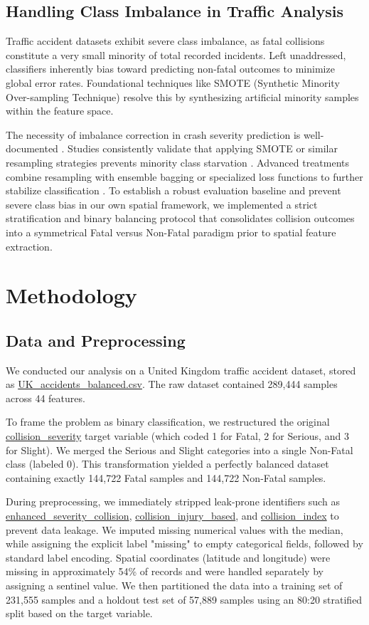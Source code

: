 \documentclass[runningheads]{llncs}
\begin{document}
\subsection{Handling Class Imbalance in Traffic Analysis}
Traffic accident datasets exhibit severe class imbalance, as fatal collisions constitute a very small minority of total recorded incidents. Left unaddressed, classifiers inherently bias toward predicting non-fatal outcomes to minimize global error rates. Foundational techniques like SMOTE (Synthetic Minority Over-sampling Technique) \cite{chawla2002} resolve this by synthesizing artificial minority samples within the feature space.

The necessity of imbalance correction in crash severity prediction is well-documented \cite{amiri2025,bazarnovi2024,fiorentini2020}. Studies consistently validate that applying SMOTE or similar resampling strategies prevents minority class starvation \cite{jeong2018,ogungbire2024}. Advanced treatments combine resampling with ensemble bagging or specialized loss functions to further stabilize classification \cite{mohammadpour2023,niyogisubizo2023}. To establish a robust evaluation baseline and prevent severe class bias in our own spatial framework, we implemented a strict stratification and binary balancing protocol that consolidates collision outcomes into a symmetrical Fatal versus Non-Fatal paradigm prior to spatial feature extraction.


\section{Methodology}

\subsection{Data and Preprocessing}

We conducted our analysis on a United Kingdom traffic accident dataset, stored as \url{UK_accidents_balanced.csv}. The raw dataset contained 289,444 samples across 44 features.

To frame the problem as binary classification, we restructured the original \url{collision_severity} target variable (which coded 1 for Fatal, 2 for Serious, and 3 for Slight). We merged the Serious and Slight categories into a single Non-Fatal class (labeled 0). This transformation yielded a perfectly balanced dataset containing exactly 144,722 Fatal samples and 144,722 Non-Fatal samples.

During preprocessing, we immediately stripped leak-prone identifiers such as \url{enhanced_severity_collision}, \url{collision_injury_based}, and \url{collision_index} to prevent data leakage. We imputed missing numerical values with the median, while assigning the explicit label "missing" to empty categorical fields, followed by standard label encoding. Spatial coordinates (latitude and longitude) were missing in approximately 54\% of records and were handled separately by assigning a sentinel value. We then partitioned the data into a training set of 231,555 samples and a holdout test set of 57,889 samples using an 80:20 stratified split based on the target variable.
\end{document}
